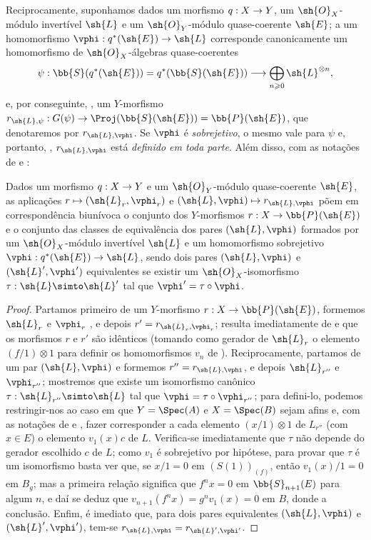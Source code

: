 \documentclass[oneside,10pt]{amsart}
\makeatletter
\renewcommand{\geq}{\geqslant}
\newcommand{\ega@arrow}[2]{\mathchoice{#1}{#2}{#2}{#2}}
\let\ega@shortmapsto\mapsto
\renewcommand{\to}{\ega@arrow{\longrightarrow}{\rightarrow}}
\renewcommand{\mapsto}{\ega@arrow{\longmapsto}{\ega@shortmapsto}}
\newcommand{\oldpage}[2][]{\marginnote{\normalfont\footnotesize\textbf{#1}~|~#2}\ignorespaces}
\let\EGAOriginalLabel\label
\renewcommand{\label}[1]{\phantomsection\EGAOriginalLabel{#1}}
\makeatother
\begin{document}
\begin{env}[4.2.2]
\label{II.4.2.2}
Reciprocamente, suponhamos dados um morfismo $q:X\to Y$, um $\sh{O}_X$-módulo invertível $\sh{L}$ e um $\sh{O}_Y$-módulo quase-coerente $\sh{E}$;
a um homomorfismo $\vphi:q^*(\sh{E})\to\sh{L}$ corresponde canonicamente um homomorfismo de $\sh{O}_X$-álgebras quase-coerentes
\[
  \psi: \bb{S}(q^*(\sh{E})) = q^*(\bb{S}(\sh{E})) \to \bigoplus_{n\geq0}\sh{L}^{\otimes n},
\]
e, por conseguinte, , um $Y$-morfismo $r_{\sh{L},\psi}:G(\psi)\to\Proj(\bb{S}(\sh{E}))=\bb{P}(\sh{E})$, que denotaremos por $r_{\sh{L},\vphi}$.
Se $\vphi$ é \emph{sobrejetivo}, o mesmo vale para $\psi$ e, portanto, , $r_{\sh{L},\vphi}$ está \emph{definido em toda parte}.
Além disso, com as notações de  e :
\end{env}

\begin{proposition}[4.2.3]
\label{II.4.2.3}
Dados um morfismo $q:X\to Y$ e um $\sh{O}_Y$-módulo quase-coerente $\sh{E}$, as aplicações $r\mapsto(\sh{L}_r,\vphi_r)$ e $(\sh{L},\vphi)\mapsto r_{\sh{L},\vphi}$ põem em correspondência biunívoca o conjunto dos $Y$-morfismos $r:X\to\bb{P}(\sh{E})$ e o conjunto das classes de equivalência dos pares $(\sh{L},\vphi)$ formados por um $\sh{O}_X$-módulo invertível $\sh{L}$ e um homomorfismo sobrejetivo $\vphi:q^*(\sh{E})\to\sh{L}$, sendo dois pares $(\sh{L},\vphi)$ e $(\sh{L}',\vphi')$ equivalentes se existir um $\sh{O}_X$-isomorfismo $\tau:\sh{L}\simto\sh{L}'$ tal que $\vphi'=\tau\circ\vphi$.
\end{proposition}

\begin{proof}
Partamos primeiro de um $Y$-morfismo $r:X\to\bb{P}(\sh{E})$, formemos $\sh{L}_r$ e $\vphi_r$ , e depois $r'=r_{\sh{L}_r,\vphi_r}$;
resulta imediatamente de  e  que os morfismos $r$ e $r'$ são idênticos (tomando como gerador de $\sh{L}_r$ o elemento $(f/1)\otimes1$ para definir os homomorfismos $v_n$ de ).
Reciprocamente, partamos de um par $(\sh{L},\vphi)$ e formemos
\oldpage[II]{74}
$r''=r_{\sh{L},\vphi}$, e depois $\sh{L}_{r''}$ e $\vphi_{r''}$;
mostremos que existe um isomorfismo canônico $\tau:\sh{L}_{r''}\simto\sh{L}$ tal que $\vphi=\tau\circ\vphi_{r''}$;
para defini-lo, podemos restringir-nos ao caso em que $Y=\Spec(A)$ e $X=\Spec(B)$ sejam afins e, com as notações de  e , fazer corresponder a cada elemento $(x/1)\otimes1$ de $L_{r''}$ (com $x\in E$) o elemento $v_1(x)c$ de $L$.
Verifica-se imediatamente que $\tau$ não depende do gerador escolhido $c$ de $L$;
como $v_1$ é sobrejetivo por hipótese, para provar que $\tau$ é um isomorfismo basta ver que, se $x/1=0$ em $(S(1))_{(f)}$, então $v_1(x)/1=0$ em $B_g$;
mas a primeira relação significa que $f^nx=0$ em $\bb{S}_{n+1}(E)$ para algum $n$, e daí se deduz que $v_{n+1}(f^nx)=g^nv_1(x)=0$ em $B$, donde a conclusão.
Enfim, é imediato que, para dois pares equivalentes $(\sh{L},\vphi)$ e $(\sh{L}',\vphi')$, tem-se $r_{\sh{L},\vphi}=r_{\sh{L}',\vphi'}$.
\end{proof}
\end{document}
